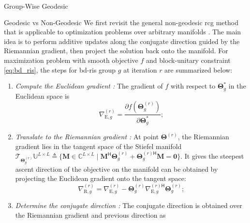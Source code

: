 \documentclass[journal]{IEEEtran}
\begin{document}
\begin{section}{Group-Wise Geodesic }
	\begin{subsection}{Geodesic vs Non-Geodesic }
		We first revisit the general non-geodesic \gls{rcg} method that is applicable to optimization problems over arbitrary manifolds \cite{Absil2009,Pan2022d}.
		The main idea is to perform {additive} updates along the conjugate direction guided by the Riemannian gradient, then {project} the solution back onto the manifold.
		For maximization problem with smooth objective $f$ and block-unitary constraint \eqref{eq:bd_ris}, the steps for \gls{bd}-\gls{ris} group $g$ at iteration $r$ are summarized below:
		\begin{enumerate}
			\item \emph{Compute the Euclidean gradient \cite{Hjorungnes2007}:} The gradient of $f$ with respect to $\mathbf{\Theta}_g^*$ in the Euclidean space is
			\begin{equation}
				\nabla_{\mathrm{E},g}^{(r)} = \frac{\partial f(\mathbf{\Theta}_g^{(r)})}{\partial \mathbf{\Theta}_g^*};
				\label{eq:gradient_euclidean}
			\end{equation}
			\item \emph{Translate to the Riemannian gradient \cite{Absil2009}:} At point $\mathbf{\Theta}^{(r)}$, the Riemannian gradient lies in the tangent space of the Stiefel manifold $\mathcal{T}_{\mathbf{\Theta}_g^{(r)}}\mathbb{U}^{L \times L} \triangleq \{\mathbf{M} \in \mathbb{C}^{L \times L} \mid \mathbf{M}^\mathsf{H} \mathbf{\Theta}_g^{(r)} + {\mathbf{\Theta}_g^{(r)\mathsf{H}}} \mathbf{M} = \mathbf{0}\}$. It gives the steepest ascent direction of the objective on the manifold can be obtained by projecting the Euclidean gradient onto the tangent space:
			\begin{equation}
				\nabla_{\mathrm{R},g}^{(r)} = \nabla_{\mathrm{E},g}^{(r)} - \mathbf{\Theta}_g^{(r)} {\nabla_{\mathrm{E},g}^{(r)\mathsf{H}}} \mathbf{\Theta}_g^{(r)};
				\label{eq:gradient_riemannian}
			\end{equation}
			\item \emph{Determine the conjugate direction \cite{Nocedal2006}:} The conjugate direction is obtained over the Riemannian gradient and previous direction as

\end{enumerate}
\end{subsection}
\end{section}
\end{document}
